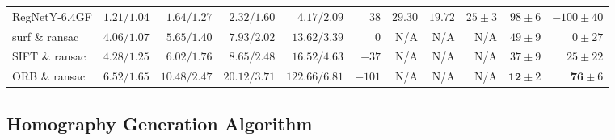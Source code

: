 \begin{table}
\begin{adjustbox}{angle=90, max height=0.85\textheight}
\begin{tabular}{lrrrrrrrrrr}
        RegNetY-6.4GF   & $\mathbf{1.21}/1.04$ & $ \mathbf{1.64}/1.27$ & $ 2.32/1.60         $ & $  4.17/2.09                  $ & $  38         $ & $29.30$ & $19.72$ & $25          \pm 3$ & $98          \pm 6$ & $-100          \pm 40$ \\
        \gls{surf} \& \gls{ransac}  & $4.06/1.07         $ & $ 5.65/1.40         $ & $ 7.93/2.02         $ & $ 13.62/3.39                  $ & $   0         $ & N/A     & N/A     &  N/A                & $49          \pm 9$ & $   0          \pm 27$ \\
        SIFT \& \gls{ransac}  & $4.28/1.25         $ & $ 6.02/1.76         $ & $ 8.65/2.48         $ & $ 16.52/4.63                  $ & $- 37         $ & N/A     & N/A     &  N/A                & $37          \pm 9$ & $  25          \pm 22$ \\
        ORB \& \gls{ransac}   & $6.52/1.65         $ & $10.48/2.47         $ & $20.12/3.71         $ & $122.66/6.81                  $ & $-101         $ & N/A     & N/A     &  N/A                & $\mathbf{12} \pm 2$ & $  \mathbf{76} \pm  6$ \\ \bottomrule
    \end{tabular}
\end{adjustbox}
\end{table}
\subsection{Homography Generation Algorithm}
\label{c3:sec:hom_opt}


